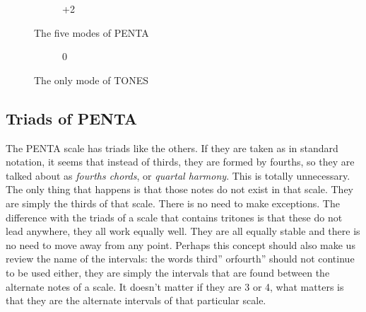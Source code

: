 \documentclass[]{report}
\begin{document}
\begin{figure}[H]
\begin{subfigure}{0.10\textwidth}
\begin{tikzpicture}
    \end{tikzpicture}
  \caption{\textsf{+2}}
  
\end{subfigure}
\caption{The five modes of \textsf{PENTA}}\label{fig:the-penta-modes}

\end{figure}
\begin{figure}[H]
\begin{subfigure}{1\textwidth}
\centering
{}    
    \caption{\textsf{0}}
    
  \end{subfigure}
\caption{The only mode of \textsf{TONES}}\label{fig:the-tones-modes}

\end{figure}
\subsection{Triads of \textsf{PENTA}}
The \textsf{PENTA} scale has triads like the others. If they are taken as in standard notation, it seems that instead of thirds, they are formed by fourths, so they are talked about as \emph{fourths chords}, or \emph{quartal harmony}. This is totally unnecessary. The only thing that happens is that those notes do not exist in that scale. They are simply the thirds of that scale. There is no need to make exceptions. The difference with the triads of a scale that contains tritones is that these do not lead anywhere, they all work equally well. They are all equally stable and there is no need to move away from any point.
Perhaps this concept should also make us review the name of the intervals: the words third'' orfourth'' should not continue to be used either, they are simply the intervals that are found between the alternate notes of a scale. It doesn't matter if they are 3 or 4, what matters is that they are the alternate intervals of that particular scale.
\end{document}
